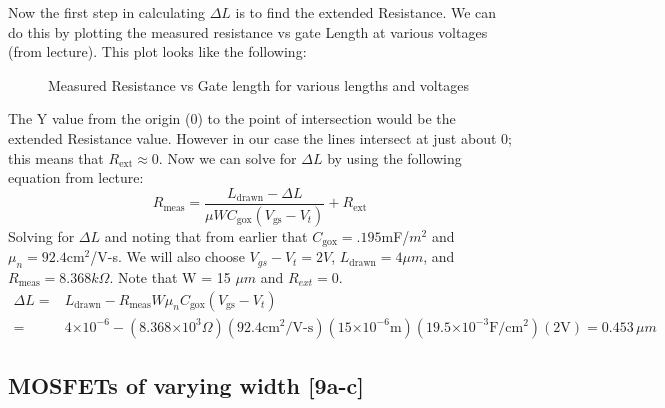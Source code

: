 \documentclass{article}
\providecommand{\e}[1]{\ensuremath{\times 10^{#1}}}
\begin{document}
Now the first step in calculating $\Delta L$ is to find the extended Resistance. We can do this by plotting the measured resistance vs gate Length at various voltages (from lecture). This plot looks like the following:
\begin{figure}[H]
\centering
{}
\caption{Measured Resistance vs Gate length for various lengths and voltages}
\end{figure}
The Y value from the origin (0) to the point of intersection would be the extended Resistance value. However in our case the lines intersect at just about 0; this means that $R_{\text{ext}} \approx 0$. Now we can solve for $\Delta L$ by using the following equation from lecture:
\begin{equation}
R_{\text{meas}} = \frac{L_{\text{drawn}} - \Delta L}{\mu W C_{\text{gox}} (V_{\text{gs}} - V_t)} + R_{\text{ext}}
\end{equation}
Solving for $\Delta L$ and noting that from earlier that $C_{\text{gox}} = .195$mF/${m}^{2}$ and $\mu_n = 92.4 {\text{cm}}^{2}$/V-s. We will also choose $V_{gs} - V_t = 2 V$, $L_{\text{drawn}} = 4 \mu m$, and $R_{\text{meas}} = 8.368 k\Omega$. Note that W = 15 $\mu m$ and $R_{ext} = 0$.
\begin{align*}
\Delta L =& L_{\text{drawn}} - R_{\text{meas}}W\mu_n C_{\text{gox}} (V_{\text{gs}} - V_t) \\
=& 4\e{-6} - (8.368\e{3}\Omega)(92.4 {\text{cm}}^{2}/\text{V-s})(15\e{-6}\text{m})(19.5\e{-3}\text{F}/{\text{cm}}^{2})(2\text{V}) = 0.453 \,\mu m
\end{align*}

\subsection{MOSFETs of varying width [9a-c]} %
\end{document}

